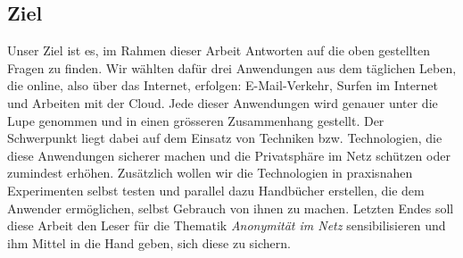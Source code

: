 \subsection{Ziel}
Unser Ziel ist es, im Rahmen dieser Arbeit Antworten auf die oben gestellten Fragen zu finden. Wir wählten dafür drei Anwendungen aus dem täglichen Leben, die online, also über das Internet, erfolgen: E-Mail-Verkehr, Surfen im Internet und  Arbeiten mit der Cloud. Jede dieser Anwendungen wird genauer unter die Lupe genommen und in einen grösseren Zusammenhang gestellt. Der Schwerpunkt liegt dabei auf dem Einsatz von Techniken bzw. Technologien, die diese Anwendungen sicherer machen und die Privatsphäre im Netz schützen oder zumindest erhöhen. Zusätzlich wollen wir die Technologien in praxisnahen Experimenten selbst testen und parallel dazu Handbücher erstellen, die dem Anwender ermöglichen, selbst Gebrauch von ihnen zu machen. Letzten Endes soll diese Arbeit den Leser für die Thematik \textit{Anonymität im Netz} sensibilisieren und ihm Mittel in die Hand geben, sich diese zu sichern.
